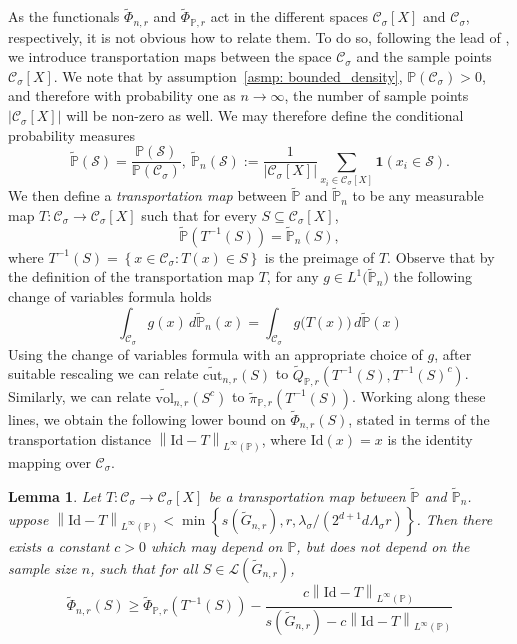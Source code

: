 \documentclass[11pt,twoside]{article}
\newtheorem{lemma}{Lemma}
\newcommand{\set}[1]{\left\{#1\right\}}
\newcommand{\vol}{\mathrm{vol}}
\newcommand{\cut}{\mathrm{cut}}
\newcommand{\abs}[1]{\left \lvert #1 \right \rvert}
\newcommand{\norm}[1]{\left\lVert#1\right\rVert}
\newcommand{\1}{\mathbf{1}}
\newcommand{\Xbf}{X}             %
\newcommand{\Pbb}{\mathbb{P}}
\newcommand{\Sset}{\mathcal{S}}
\newcommand{\Cset}{\mathcal{C}}
\newcommand{\Csig}{\Cset_{\sigma}}
\begin{document}
As the functionals $\widetilde{\Phi}_{n,r}$ and $\widetilde{\Phi}_{\Pbb,r}$ act in the different spaces $\Csig[\Xbf]$ and $\Csig$, respectively, it is not obvious how to relate them. To do so, following the lead of \cite{garciatrillos16}, we introduce transportation maps between the space $\Csig$ and the sample points $\Csig[\Xbf]$. We note that by assumption~\ref{asmp: bounded_density}, $\Pbb(\Csig) > 0$, and therefore with probability one as $n \to \infty$, the number of sample points $\abs{\Csig[\Xbf]}$ will be non-zero as well. We may therefore define the conditional probability measures
\begin{equation*}
\widetilde{\Pbb}(\Sset) = \frac{\Pbb(\Sset)}{\Pbb(\Csig)}, ~ \widetilde{\Pbb}_{n}(\Sset) := \frac{1}{\abs{\Csig[\Xbf]}} \sum_{x_i \in \Csig[\Xbf]} \1(x_i \in \Sset).
\end{equation*} 
We then define a \emph{transportation map} between $\widetilde{\Pbb}$ and $\widetilde{\Pbb}_n$ to be any measurable map $T: \Csig \to \Csig[\Xbf]$ such that for every $S \subseteq \Csig[\Xbf]$,
\begin{equation*}
\widetilde{\Pbb}(T^{-1}(S)) = \widetilde{\Pbb}_n(S),
\end{equation*}
where $T^{-1}(S) = \set{x \in \Csig: T(x) \in S}$ is the preimage of $T$. Observe that by the definition of the transportation map $T$, for any $g \in L^1\bigl(\widetilde{\Pbb}_n\bigr)$ the following change of variables formula holds
\begin{equation*}
\int_{\Csig} g(x) \,d\widetilde{\Pbb}_{n}(x) = \int_{\Csig} g\bigl(T(x)\bigr) \,d\widetilde{\Pbb}(x)
\end{equation*}
Using the change of variables formula with an appropriate choice of $g$, after suitable rescaling we can relate $\widetilde{\cut}_{n,r}(S)$ to $\widetilde{Q}_{\Pbb,r}(T^{-1}(S), T^{-1}(S)^c)$. Similarly, we can relate $\widetilde{\vol}_{n,r}(S^c)$ to $\widetilde{\pi}_{\Pbb,r}(T^{-1}(S))$. Working along these lines, we obtain the following lower bound on $\widetilde{\Phi}_{n,r}(S)$, stated in terms of the transportation distance $\norm{\mathrm{Id} - T}_{L^{\infty}(\Pbb)}$, where $\mathrm{Id}(x) = x$ is the identity mapping over $\Csig$.

\begin{lemma}
	\label{lem: graph_to_continuous_conductance}
	Let $T:\Csig \to \Csig[\Xbf]$ be a transportation map between $\widetilde{\Pbb}$ and $\widetilde{\Pbb}_n$. uppose $\norm{\mathrm{Id} - T}_{L^{\infty}(\Pbb)} < \min \set{s(\widetilde{G}_{n,r}),r, \lambda_{\sigma}/(2^{d+1}d\Lambda_{\sigma}r)}$. Then there exists a constant $c > 0$ which may depend on $\Pbb$, but does not depend on the sample size $n$, such that for all $S \in \mathcal{L}(\widetilde{G}_{n,r})$, 
	\begin{equation}
	\label{eqn: graph_to_continuous_conductance}
	\widetilde{\Phi}_{n,r}(S) \geq \widetilde{\Phi}_{\Pbb,r}(T^{-1}(S)) - \frac{c \norm{\mathrm{Id} - T}_{L^{\infty}(\Pbb)} }{s(\widetilde{G}_{n,r}) - c \norm{\mathrm{Id} - T}_{L^{\infty}(\Pbb)}  }
	\end{equation}
\end{lemma}
\end{document}
